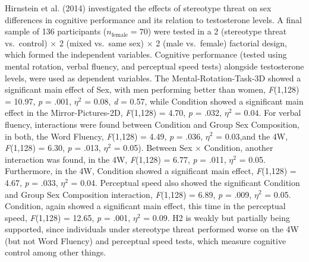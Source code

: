 \documentclass[
  stu, a4paper, 12pt,mask,floatsintext]{apa7}
\begin{document}
Hirnstein et al. (2014) investigated the effects of stereotype threat on sex differences in cognitive performance and its relation to testosterone levels.
A final sample of 136 participants (\(n_{\text{female}} = 70\)) were tested in a 2 (stereotype threat vs.~control) \(\times\) 2 (mixed vs.~same sex) \(\times\) 2 (male vs.~female) factorial design, which formed the independent variables.
Cognitive performance (tested using mental rotation, verbal fluency, and perceptual speed tests) alongside testosterone levels, were used as dependent variables.
The Mental-Rotation-Task-3D showed a significant main effect of Sex, with men performing better than women, \emph{F}(1,128) = 10.97, \emph{p} = .001, \(\eta^{2}\) = 0.08, \emph{d} = 0.57, while Condition showed a significant main effect in the Mirror-Pictures-2D, \emph{F}(1,128) = 4.70, \emph{p} = .032, \(\eta^{2}\) = 0.04.
For verbal fluency, interactions were found between Condition and Group Sex Composition, in both, the Word Fluency, \emph{F}(1,128) = 4.49, \emph{p} = .036, \(\eta^{2}\) = 0.03,and the 4W, \emph{F}(1,128) = 6.30, \emph{p} = .013, \(\eta^{2}\) = 0.05).
Between Sex \(\times\) Condition, another interaction was found, in the 4W, \emph{F}(1,128) = 6.77, \emph{p} = .011, \(\eta^{2}\) = 0.05.
Furthermore, in the 4W, Condition showed a significant main effect, \emph{F}(1,128) = 4.67, \emph{p} = .033, \(\eta^{2}\) = 0.04.
Perceptual speed also showed the significant Condition and Group Sex Composition interaction, \emph{F}(1,128) = 6.89, \emph{p} = .009, \(\eta^{2}\) = 0.05.
Condition, again showed a significant main effect, this time in the perceptual speed, \emph{F}(1,128) = 12.65, \emph{p} = .001, \(\eta^{2}\) = 0.09.
H2 is weakly but partially being supported, since individuals under stereotype threat performed worse on the 4W (but not Word Fluency) and perceptual speed tests, which measure cognitive control among other things.
\end{document}
